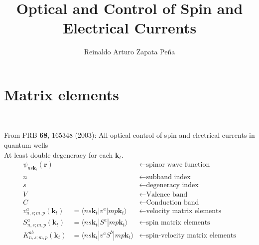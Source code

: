 \documentclass{article}
\title{Optical and Control of Spin and Electrical Currents}
\author{Reinaldo Arturo Zapata Pe\~na}
\date{}
\begin{document}
\maketitle

\section{Matrix elements}

\


From PRB \textbf{68}, 165348 (2003): All-optical control of spin and electrical
currents in quantum wells
\\

At least double degeneracy for each $\mathbf{k}_{t}$.
\begin{align*}
\psi_{ns\mathbf{k}_{t}}(\mathbf{r})  && \leftarrow \text{spinor wave function}\\
n && \leftarrow  \text{subband index} \\
s && \leftarrow  \text{degeneracy index} \\
V && \leftarrow  \text{Valence band} \\
C && \leftarrow  \text{Conduction band} \\
v_{n,s;m,p}^{a}(\mathbf{k}_{t}) &= \langle ns\mathbf{k}_{t} | v^{a} |
mp\mathbf{k}_{t} \rangle & \leftarrow \text{velocity matrix elements}\\
S_{n,s;m,p}^{a}(\mathbf{k}_{t}) &= \langle ns\mathbf{k}_{t} | S^{a} |
mp\mathbf{k}_{t} \rangle & \leftarrow \text{spin matrix elements}\\
K_{n,s;m,p}^{ab}(\mathbf{k}_{t})&= \langle ns\mathbf{k}_{t} | v^{a}S^{b} |
mp\mathbf{k}_{t} \rangle & \leftarrow \text{spin-velocity matrix elements}\\
\end{align*}




\end{document}
